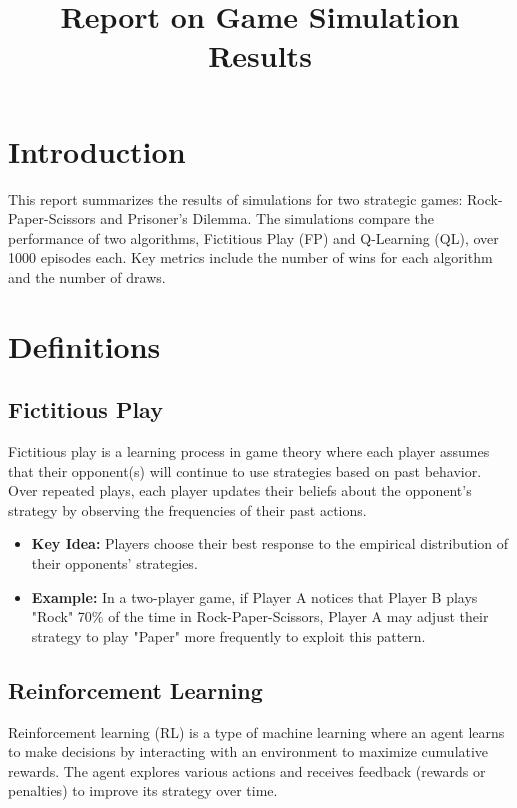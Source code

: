 \documentclass{article}
\title{Report on Game Simulation Results}
\author{}
\date{}
\begin{document}
\maketitle
\tableofcontents
\pagebreak

\section{Introduction}
This report summarizes the results of simulations for two strategic games: Rock-Paper-Scissors and Prisoner's Dilemma. The simulations compare the performance of two algorithms, Fictitious Play (FP) and Q-Learning (QL), over 1000 episodes each. Key metrics include the number of wins for each algorithm and the number of draws.

\section{Definitions}

\subsection{Fictitious Play}
Fictitious play is a learning process in game theory where each player assumes that their opponent(s) will continue to use strategies based on past behavior. Over repeated plays, each player updates their beliefs about the opponent’s strategy by observing the frequencies of their past actions.

\begin{itemize}
    \item \textbf{Key Idea:} Players choose their best response to the empirical distribution of their opponents’ strategies.
    \item \textbf{Example:} In a two-player game, if Player A notices that Player B plays "Rock" 70\% of the time in Rock-Paper-Scissors, Player A may adjust their strategy to play "Paper" more frequently to exploit this pattern.
\end{itemize}

\subsection{Reinforcement Learning}
Reinforcement learning (RL) is a type of machine learning where an agent learns to make decisions by interacting with an environment to maximize cumulative rewards. The agent explores various actions and receives feedback (rewards or penalties) to improve its strategy over time.
\end{document}
